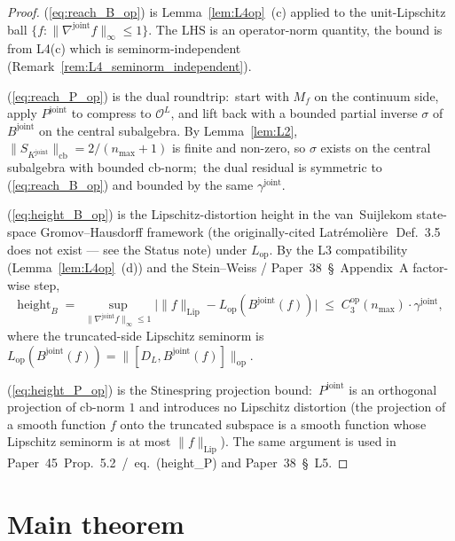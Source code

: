 \documentclass[11pt,a4paper]{article}
\theoremstyle{plain}
\theoremstyle{definition}
\newcommand{\nmax}{n_{\max}}
\newcommand{\Op}{\mathcal{O}}
\newcommand{\opnorm}[1]{\lVert #1 \rVert_{\mathrm{op}}}
\newcommand{\cbnorm}[1]{\lVert #1 \rVert_{\mathrm{cb}}}
\newcommand{\norm}[1]{\lVert #1 \rVert}
\newcommand{\DL}{D_{L}}
\newcommand{\Lop}{L_{\mathrm{op}}}
\newcommand{\Bjoint}{B^{\mathrm{joint}}}
\newcommand{\Pjoint}{P^{\mathrm{joint}}}
\newcommand{\Kjoint}{K^{\mathrm{joint}}}
\newcommand{\gammajoint}{\gamma^{\mathrm{joint}}}
\newcommand{\Cthreeop}{C_{3}^{\mathrm{op}}}
\begin{document}
\begin{proof}
(\ref{eq:reach_B_op}) is Lemma~\ref{lem:L4op}~(c) applied to the
unit-Lipschitz ball $\{f : \norm{\nabla^{\mathrm{joint}} f}_{\infty} \le 1\}$. The
LHS is an operator-norm quantity, the bound is from L4(c) which is
seminorm-independent (Remark~\ref{rem:L4_seminorm_independent}).

(\ref{eq:reach_P_op}) is the dual roundtrip:\ start with $M_{f}$ on
the continuum side, apply $\Pjoint$ to compress to $\Op^{L}$, and lift
back with a bounded partial inverse $\sigma$ of $\Bjoint$ on the
central subalgebra. By Lemma~\ref{lem:L2}, $\cbnorm{S_{\Kjoint}}
= 2/(\nmax + 1)$ is finite and non-zero, so $\sigma$ exists on the
central subalgebra with bounded cb-norm;\ the dual residual is
symmetric to (\ref{eq:reach_B_op}) and bounded by the same
$\gammajoint$.

(\ref{eq:height_B_op}) is the Lipschitz-distortion height in the
van~Suijlekom state-space Gromov--Hausdorff framework (the
originally-cited Latr\'emoli\`ere~\cite{latremoliere_metric_st_2017}\,Def.~3.5
does not exist --- see the Status note) under
$\Lop$. By the L3 compatibility (Lemma~\ref{lem:L4op}~(d)) and the
Stein--Weiss / Paper~38~\S~Appendix~A factor-wise step,
\begin{equation*}
   \mathrm{height}_{B}
   \;=\; \sup_{\norm{\nabla^{\mathrm{joint}} f}_{\infty} \le 1}
        \bigl|\norm{f}_{\mathrm{Lip}} - \Lop(\Bjoint(f))\bigr|
   \;\le\; \Cthreeop(\nmax) \cdot \gammajoint,
\end{equation*}
where the truncated-side Lipschitz seminorm is
$\Lop(\Bjoint(f)) = \opnorm{[\DL, \Bjoint(f)]}$.

(\ref{eq:height_P_op}) is the Stinespring projection bound:\ $\Pjoint$
is an orthogonal projection of cb-norm $1$ and introduces no
Lipschitz distortion (the projection of a smooth function $f$ onto the
truncated subspace is a smooth function whose Lipschitz seminorm is at
most $\norm{f}_{\mathrm{Lip}}$). The same argument is used in
Paper~45~Prop.~5.2~/~eq.~(height\_P) and Paper~38~\S~L5. \qedhere
\end{proof}

\section{Main theorem}\label{sec:main}
\end{document}
